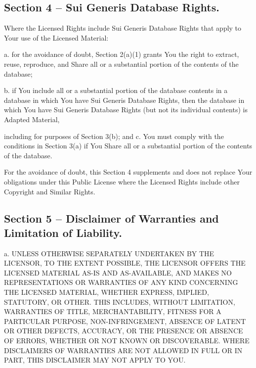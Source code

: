 \subsection*{Section 4 -- Sui Generis Database Rights.}

Where the Licensed Rights include Sui Generis Database Rights that apply to Your use of the Licensed Material\+:

a. for the avoidance of doubt, Section 2(a)(1) grants You the right to extract, reuse, reproduce, and Share all or a substantial portion of the contents of the database;

b. if You include all or a substantial portion of the database contents in a database in which You have Sui Generis Database Rights, then the database in which You have Sui Generis Database Rights (but not its individual contents) is Adapted Material,

including for purposes of Section 3(b); and c. You must comply with the conditions in Section 3(a) if You Share all or a substantial portion of the contents of the database.

For the avoidance of doubt, this Section 4 supplements and does not replace Your obligations under this Public License where the Licensed Rights include other Copyright and Similar Rights.

\subsection*{Section 5 -- Disclaimer of Warranties and Limitation of Liability.}

a. U\+N\+L\+E\+SS O\+T\+H\+E\+R\+W\+I\+SE S\+E\+P\+A\+R\+A\+T\+E\+LY U\+N\+D\+E\+R\+T\+A\+K\+EN BY T\+HE L\+I\+C\+E\+N\+S\+OR, TO T\+HE E\+X\+T\+E\+NT P\+O\+S\+S\+I\+B\+LE, T\+HE L\+I\+C\+E\+N\+S\+OR O\+F\+F\+E\+RS T\+HE L\+I\+C\+E\+N\+S\+ED M\+A\+T\+E\+R\+I\+AL A\+S-\/\+IS A\+ND A\+S-\/\+A\+V\+A\+I\+L\+A\+B\+LE, A\+ND M\+A\+K\+ES NO R\+E\+P\+R\+E\+S\+E\+N\+T\+A\+T\+I\+O\+NS OR W\+A\+R\+R\+A\+N\+T\+I\+ES OF A\+NY K\+I\+ND C\+O\+N\+C\+E\+R\+N\+I\+NG T\+HE L\+I\+C\+E\+N\+S\+ED M\+A\+T\+E\+R\+I\+AL, W\+H\+E\+T\+H\+ER E\+X\+P\+R\+E\+SS, I\+M\+P\+L\+I\+ED, S\+T\+A\+T\+U\+T\+O\+RY, OR O\+T\+H\+ER. T\+H\+IS I\+N\+C\+L\+U\+D\+ES, W\+I\+T\+H\+O\+UT L\+I\+M\+I\+T\+A\+T\+I\+ON, W\+A\+R\+R\+A\+N\+T\+I\+ES OF T\+I\+T\+LE, M\+E\+R\+C\+H\+A\+N\+T\+A\+B\+I\+L\+I\+TY, F\+I\+T\+N\+E\+SS F\+OR A P\+A\+R\+T\+I\+C\+U\+L\+AR P\+U\+R\+P\+O\+SE, N\+O\+N-\/\+I\+N\+F\+R\+I\+N\+G\+E\+M\+E\+NT, A\+B\+S\+E\+N\+CE OF L\+A\+T\+E\+NT OR O\+T\+H\+ER D\+E\+F\+E\+C\+TS, A\+C\+C\+U\+R\+A\+CY, OR T\+HE P\+R\+E\+S\+E\+N\+CE OR A\+B\+S\+E\+N\+CE OF E\+R\+R\+O\+RS, W\+H\+E\+T\+H\+ER OR N\+OT K\+N\+O\+WN OR D\+I\+S\+C\+O\+V\+E\+R\+A\+B\+LE. W\+H\+E\+RE D\+I\+S\+C\+L\+A\+I\+M\+E\+RS OF W\+A\+R\+R\+A\+N\+T\+I\+ES A\+RE N\+OT A\+L\+L\+O\+W\+ED IN F\+U\+LL OR IN P\+A\+RT, T\+H\+IS D\+I\+S\+C\+L\+A\+I\+M\+ER M\+AY N\+OT A\+P\+P\+LY TO Y\+OU.

